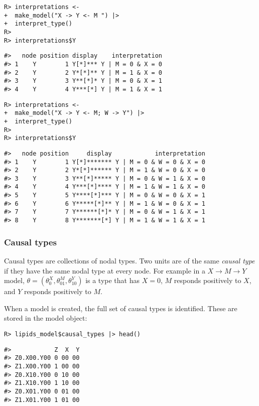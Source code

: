 \documentclass[
  11pt,
  article]{jss}
\begin{document}
\begin{verbatim}
R> interpretations <- 
+  make_model("X -> Y <- M ") |> 
+  interpret_type()
R> 
R> interpretations$Y
\end{verbatim}

\begin{verbatim}
#>   node position display    interpretation
#> 1    Y        1 Y[*]*** Y | M = 0 & X = 0
#> 2    Y        2 Y*[*]** Y | M = 1 & X = 0
#> 3    Y        3 Y**[*]* Y | M = 0 & X = 1
#> 4    Y        4 Y***[*] Y | M = 1 & X = 1
\end{verbatim}

\begin{verbatim}
R> interpretations <- 
+  make_model("X -> Y <- M; W -> Y") |> 
+  interpret_type()
R> 
R> interpretations$Y
\end{verbatim}

\begin{verbatim}
#>   node position     display            interpretation
#> 1    Y        1 Y[*]******* Y | M = 0 & W = 0 & X = 0
#> 2    Y        2 Y*[*]****** Y | M = 1 & W = 0 & X = 0
#> 3    Y        3 Y**[*]***** Y | M = 0 & W = 1 & X = 0
#> 4    Y        4 Y***[*]**** Y | M = 1 & W = 1 & X = 0
#> 5    Y        5 Y****[*]*** Y | M = 0 & W = 0 & X = 1
#> 6    Y        6 Y*****[*]** Y | M = 1 & W = 0 & X = 1
#> 7    Y        7 Y******[*]* Y | M = 0 & W = 1 & X = 1
#> 8    Y        8 Y*******[*] Y | M = 1 & W = 1 & X = 1
\end{verbatim}

\hypertarget{causal-types}{%
\subsubsection{Causal types}\label{causal-types}}

Causal types are collections of nodal types. Two units are of the same
\emph{causal type} if they have the same nodal type at every node. For
example in a \(X \rightarrow M \rightarrow Y\) model,
\(\theta = (\theta^X_0, \theta^M_{01}, \theta^Y_{10})\) is a type that
has \(X=0\), \(M\) responds positively to \(X\), and \(Y\) responds
positively to \(M\).

When a model is created, the full set of causal types is identified.
These are stored in the model object:

\begin{verbatim}
R> lipids_model$causal_types |> head()
\end{verbatim}

\begin{verbatim}
#>            Z  X  Y
#> Z0.X00.Y00 0 00 00
#> Z1.X00.Y00 1 00 00
#> Z0.X10.Y00 0 10 00
#> Z1.X10.Y00 1 10 00
#> Z0.X01.Y00 0 01 00
#> Z1.X01.Y00 1 01 00
\end{verbatim}
\end{document}
